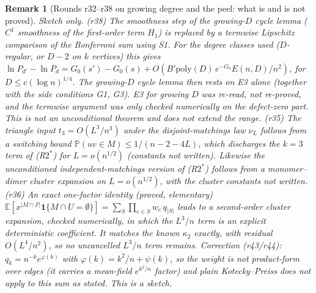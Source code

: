 \documentclass[11pt]{article}
\newtheorem{remark}[theorem]{Remark}
\newcommand{\EE}{\mathbb{E}}
\newcommand{\PP}{\mathbb{P}}
\begin{document}
\begin{remark}[Rounds r32--r38 on growing degree and the peel: what is and is not proved]
\emph{Sketch only.}
(r38) The smoothness step of the growing-\(D\) cycle lemma (\(C^1\) smoothness of
the first-order term \(H_1\)) is replaced by a termwise Lipschitz comparison of
the Bonferroni sum using S1. For the degree classes used (\(D\)-regular, or
\(D-2\) on \(k\) vertices) this gives
\(\ln P_{d'}-\ln P_d=G_0(s')-G_0(s)+O(B'\mathrm{poly}(D)\,e^{-G_0}E(n,D)/n^2)\),
for \(D\le c(\log n)^{1/4}\). The growing-\(D\) cycle lemma then rests on E3
alone (together with the side conditions G1, G3). E3 for growing \(D\) was
re-read, not re-proved, and the termwise argument was only checked numerically on
the defect-zero part. This is not an unconditional theorem and does not extend the
range.
(r35) The triangle input \(t_3=O(L^3/n^3)\) under the disjoint-matchings law
\(\nu_L\) follows from a switching bound
\(\PP(uv\in M)\le1/(n-2-4L)\), which discharges the \(k=3\) term of (R\(2^*\))
for \(L=o(n^{1/2})\) (constants not written). Likewise the \emph{unconditioned}
independent-matchings version of (R\(2^*\)) follows from a monomer--dimer cluster
expansion on \(L=o(n^{1/2})\), with the cluster constants not written.
(r36) An exact one-factor identity (proved, elementary)
\(\EE[x^{|M\cap F|}\mathbf 1\{M\cap U=\emptyset\}]=\sum_S\prod_{e\in S}w_e\,q_{|S|}\)
leads to a second-order cluster expansion, checked numerically, in which the
\(L^3/n\) term is an explicit deterministic coefficient. It matches the known
\(\kappa_2\) exactly, with residual \(O(L^4/n^2)\), so no uncancelled \(L^3/n\)
term remains. Correction (r43/r44): \(q_k=n^{-k}e^{\varphi(k)}\) with
\(\varphi(k)=k^2/n+\psi(k)\), so the weight is \emph{not} product-form over edges
(it carries a mean-field \(e^{k^2/n}\) factor) and plain Kotecky--Preiss does not
apply to this sum as stated. This is a sketch.

\end{remark}
\end{document}
